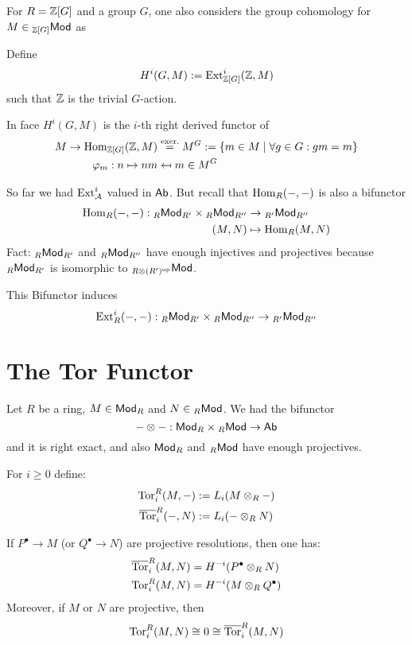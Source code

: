 \documentclass[a4paper]{report}
\begin{document}
For $R = \mathbb{Z}[G]$ and a group $G$, one also considers the group cohomology for $M \in {}_{\mathbb{Z}[G]}\mathsf{Mod}$ as
\begin{defi}
  Define \[H^{i}(G,M) := \operatorname{Ext}^{i}_{\mathbb{Z}[G]}(\mathbb{Z},M)\]such that $\mathbb{Z}$ is the trivial $G$-action.
\end{defi}
\begin{prop*}
  In face $H^{i}(G,M)$ is the $i$-th right derived functor of
  \begin{align*}
  M \to \Hom_{\Z[G]}(\Z,M) &\overset{\text{exer.}} = M^{G}:= \{m \in M \mid \forall g \in G: g m = m\} \\
  \ph_{m}: n \mps n m &\mpsfrom m \in M^{G}
\end{align*}
\end{prop*}
So far we had $\operatorname{Ext}^{i}_{\mathcal{A}}$ valued in $\mathsf{Ab}$. But recall that $\operatorname{Hom}_{R}(-,-)$ is also a bifunctor \begin{align*}
  \operatorname{Hom}_{R}(-,-): {}_R\mathsf{Mod}_{R'} \times {}_R\mathsf{Mod}_{R''} &\to {}_{R'}\mathsf{Mod}_{R''} \\
  (M,N) &\mapsto \operatorname{Hom}_{R}(M,N)
\end{align*}
Fact: ${}_R\mathsf{Mod}_{R'}$ and ${}_R\mathsf{Mod}_{R''}$ have enough injectives and projectives because ${}_R\mathsf{Mod}_{R'}$ is isomorphic to ${}_{R \otimes (R')^\mathrm{op}}\mathsf{Mod}$.

\begin{prop}[Exer]
  This Bifunctor induces
  \[\operatorname{Ext}_{R}^{i}(-,-): {}_R\mathsf{Mod}_{R'} \times {}_R\mathsf{Mod}_{R''} \to {}_{R'}\mathsf{Mod}_{R''}\]
\end{prop}

\section{The Tor Functor}
Let $R$ be a ring, $M \in \mathsf{Mod}_R$ and $N \in {}_R\mathsf{Mod}$. We had the bifunctor \[- \otimes - : \mathsf{Mod}_R \times {}_R\mathsf{Mod} \to \mathsf{Ab}\]
and it is right exact, and also $\mathsf{Mod}_R$ and ${}_R\mathsf{Mod}$ have enough projectives.
\begin{defi}
For $i \ge 0$ define: \begin{align*}
\operatorname{Tor}_{i}^{R}(M,-)&:= L_{i}(M \otimes_{R} -) \\
\overline {\operatorname{Tor}}_{i}^{R}(-,N)&:= L_{i}(- \otimes_{R} N)
\end{align*}
\end{defi}

\begin{prop}
  If $P^{\bullet} \to M$ (or $Q^{\bullet} \to N$) are projective resolutions, then one has:
  \begin{align*}
\overline {\operatorname{Tor}}_{i}^{R}(M,N) &= H^{-i}(P^{\bullet} \otimes_{R} N) \\
\operatorname{Tor}_{i}^{R}(M,N) &= H^{-i}(M \otimes_{R} Q^{\bullet})
  \end{align*}
  Moreover, if $M$ or $N$ are projective, then \[\operatorname{Tor}_{i}^{R}(M,N) \cong 0 \cong \overline {\operatorname{Tor}}_{i}^{R}(M,N)\]
\end{prop}
\end{document}
